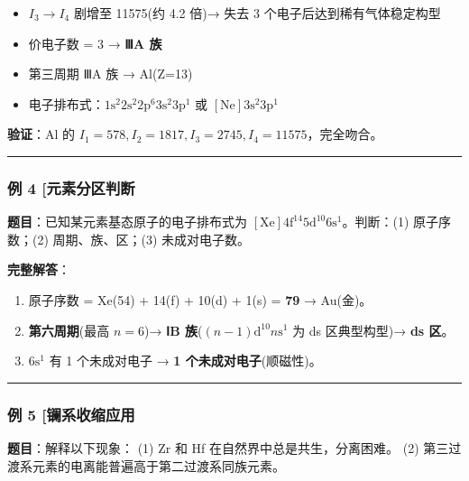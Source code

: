 \begin{itemize}
\tightlist
\item
  \(I_3 \to I_4\) 剧增至 11575(约 4.2 倍)→ 失去 3 个电子后达到稀有气体稳定构型
\item
  价电子数 = 3 → \textbf{ⅢA 族}
\item
  第三周期 ⅢA 族 → Al(Z=13)
\item
  电子排布式：\(1\mathrm{s}^2 2\mathrm{s}^2 2\mathrm{p}^6 3\mathrm{s}^2 3\mathrm{p}^1\) 或 \([\mathrm{Ne}] 3\mathrm{s}^2 3\mathrm{p}^1\)
\end{itemize}

\textbf{验证}：Al 的 \(I_1=578, I_2=1817, I_3=2745, I_4=11575\)，完全吻合。

\begin{center}\rule{0.5\linewidth}{0.5pt}\end{center}

\subsubsection{例 4 {[}元素分区判断}\label{ux4f8b-4-ux5143ux7d20ux5206ux533aux5224ux65ad}

\textbf{题目}：已知某元素基态原子的电子排布式为 \([\mathrm{Xe}] 4\mathrm{f}^{14} 5\mathrm{d}^{10} 6\mathrm{s}^1\)。判断：(1) 原子序数；(2) 周期、族、区；(3) 未成对电子数。

\textbf{完整解答}：

\begin{enumerate}
\def\labelenumi{(\arabic{enumi})}
\item
  原子序数 = Xe(54) + 14(f) + 10(d) + 1(s) = \textbf{79} → Au(金)。
\item
  \textbf{第六周期}(最高 \(n=6\))→ \textbf{ⅠB 族}(\((n-1)\mathrm{d}^{10}n\mathrm{s}^1\) 为 ds 区典型构型)→ \textbf{ds 区}。
\item
  \(6\mathrm{s}^1\) 有 1 个未成对电子 → \textbf{1 个未成对电子}(顺磁性)。
\end{enumerate}

\begin{center}\rule{0.5\linewidth}{0.5pt}\end{center}

\subsubsection{例 5 {[}镧系收缩应用}\label{ux4f8b-5-ux9567ux7cfbux6536ux7f29ux5e94ux7528}

\textbf{题目}：解释以下现象：
(1) Zr 和 Hf 在自然界中总是共生，分离困难。
(2) 第三过渡系元素的电离能普遍高于第二过渡系同族元素。

